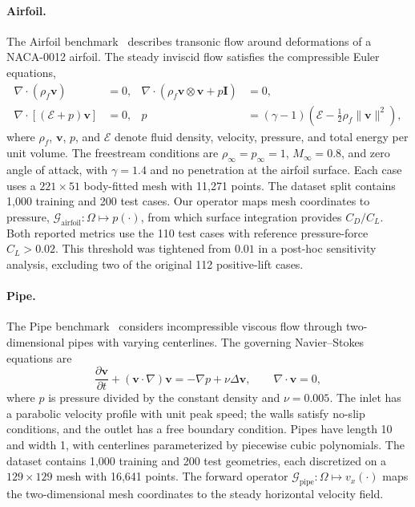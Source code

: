 \documentclass{article}
\begin{document}
\paragraph{Airfoil.}
The Airfoil benchmark~\citep{li2023geofno} describes transonic flow around deformations of a NACA-0012 airfoil. The steady inviscid flow satisfies the compressible Euler equations,
\begin{equation}
    \begin{aligned}
        \nabla\!\cdot(\rho_f\mathbf{v})&=0,
        &\nabla\!\cdot(\rho_f\mathbf{v}\otimes\mathbf{v}+p\mathbf{I})&=0,\\
        \nabla\!\cdot[(\mathcal{E}+p)\mathbf{v}]&=0,
        &p&=(\gamma-1)\left(\mathcal{E}-\tfrac12\rho_f\|\mathbf{v}\|^2\right),
    \end{aligned}
    \label{eq:app_airfoil}
\end{equation}
where $\rho_f$, $\mathbf{v}$, $p$, and $\mathcal{E}$ denote fluid density, velocity, pressure, and total energy per unit volume. The freestream conditions are $\rho_\infty=p_\infty=1$, $M_\infty=0.8$, and zero angle of attack, with $\gamma=1.4$ and no penetration at the airfoil surface. Each case uses a $221\times51$ body-fitted mesh with 11,271 points. The dataset split contains 1,000 training and 200 test cases. Our operator maps mesh coordinates to pressure, $\mathcal{G}_{\mathrm{airfoil}}:\Omega\mapsto p(\cdot)$, from which surface integration provides $C_D/C_L$. Both reported metrics use the 110 test cases with reference pressure-force $C_L>0.02$. This threshold was tightened from $0.01$ in a post-hoc sensitivity analysis, excluding two of the original 112 positive-lift cases.

\paragraph{Pipe.}
The Pipe benchmark~\citep{li2023geofno} considers incompressible viscous flow through two-dimensional pipes with varying centerlines. The governing Navier--Stokes equations are
\begin{equation}
    \frac{\partial\mathbf{v}}{\partial t}
    +(\mathbf{v}\!\cdot\nabla)\mathbf{v}
    =-\nabla p+\nu\Delta\mathbf{v},
    \qquad
    \nabla\!\cdot\mathbf{v}=0,
    \label{eq:app_pipe}
\end{equation}
where $p$ is pressure divided by the constant density and $\nu=0.005$. The inlet has a parabolic velocity profile with unit peak speed; the walls satisfy no-slip conditions, and the outlet has a free boundary condition. Pipes have length 10 and width 1, with centerlines parameterized by piecewise cubic polynomials. The dataset contains 1,000 training and 200 test geometries, each discretized on a $129\times129$ mesh with 16,641 points. The forward operator $\mathcal{G}_{\mathrm{pipe}}:\Omega\mapsto v_x(\cdot)$ maps the two-dimensional mesh coordinates to the steady horizontal velocity field.
\end{document}
